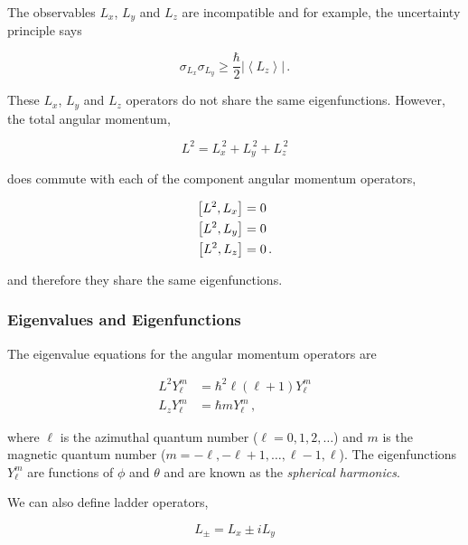 \documentclass[12pt, titlepage]{article}
\newcommand{\exv}[1]{\left\langle #1 \right\rangle}
\begin{document}
The observables $L_{x}$, $L_{y}$ and $L_{z}$ are incompatible and for example, the uncertainty principle says

\begin{equation}
	\sigma_{L_{x}}\sigma_{L_{y}} \geq \frac{\hbar}{2}\left|\exv{L_{z}}\right| \, .
\end{equation}

These  $L_{x}$, $L_{y}$ and $L_{z}$ operators do not share the same eigenfunctions. However, the total angular momentum,

\begin{equation}
	L^2 = L_{x}^{\, 2} + L_{y}^{\, 2} + L_{z}^{\, 2}
\end{equation}

does commute with each of the component angular momentum operators,

\begin{subequations}
	\begin{align}
	\comm{L^2}{L_{x}} &= 0 \\
	\comm{L^2}{L_{y}} &= 0 \\
	\comm{L^2}{L_{z}} &= 0 \, .
	\end{align}
\end{subequations}

 and therefore they share the same eigenfunctions.
 
 \subsubsection{Eigenvalues and Eigenfunctions}
 The eigenvalue equations for the angular momentum operators are 
 
 \begin{align}
 	L^2 Y_{\ell}^{m} &= \hbar^2\ell(\ell+1) Y_{\ell}^{m} \\
 	L_{z} Y_{\ell}^{m} &= \hbar m Y_{\ell}^{m} \, ,
 \end{align}
 
 where $\ell$ is the azimuthal quantum number ($\ell=0,1,2,\ldots$) and $m$ is the magnetic quantum number ($m=-\ell,-\ell+1,\ldots,\ell-1,\ell$). The eigenfunctions $Y_{\ell}^{m}$ are functions of $\phi$ and $\theta$ and are known as the \emph{spherical harmonics}.
 
 
We can also define ladder operators,

\begin{equation}
	L_{\pm} = L_{x} \pm i L_{y}
\end{equation}
\end{document}
